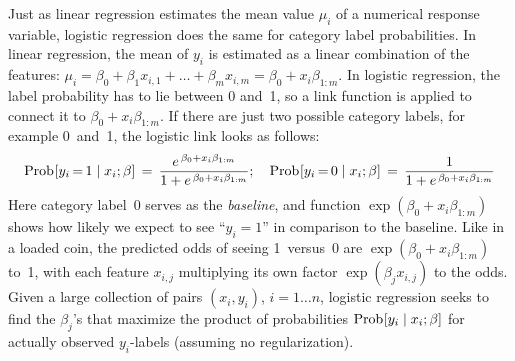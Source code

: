 Just as linear regression estimates the mean value $\mu_i$ of a numerical response
variable, logistic regression does the same for category label probabilities.
In linear regression, the mean of $y_i$ is estimated as a linear combination of the features:
$\mu_i = \beta_0 + \beta_1 x_{i,1} + \ldots + \beta_m x_{i,m} = \beta_0 + x_i\beta_{1:m}$.
In logistic regression, the
label probability has to lie between 0 and~1, so a link function is applied to connect
it to $\beta_0 + x_i\beta_{1:m}$.  If there are just two possible category labels, for example
0~and~1, the logistic link looks as follows:
\begin{equation*}
\mathop{\mathrm{Prob}\hspace{0.5pt}}\nolimits[y_i\,{=}\,1\mid x_i; \beta] \,=\, 
\frac{e^{\,\beta_0 + x_i\beta_{1:m}}}{1 + e^{\,\beta_0 + x_i\beta_{1:m}}};
\quad
\mathop{\mathrm{Prob}\hspace{0.5pt}}\nolimits[y_i\,{=}\,0\mid x_i; \beta] \,=\, 
\frac{1}{1 + e^{\,\beta_0 + x_i\beta_{1:m}}}
\end{equation*}
Here category label~0 serves as the \emph{baseline}, and function
$\exp(\beta_0 + x_i\beta_{1:m})$
shows how likely we expect to see ``$y_i = 1$'' in comparison to the baseline.
Like in a loaded coin, the predicted odds of seeing 1~versus~0 are
$\exp(\beta_0 + x_i\beta_{1:m})$ to~1,
with each feature $x_{i,j}$ multiplying its own factor $\exp(\beta_j x_{i,j})$ to the odds.
Given a large collection of pairs $(x_i, y_i)$, $i=1\ldots n$, logistic regression seeks
to find the $\beta_j$'s that maximize the product of probabilities
\hbox{$\mathop{\mathrm{Prob}\hspace{0.5pt}}\nolimits[y_i\mid x_i; \beta]$}
for actually observed $y_i$-labels (assuming no regularization).

